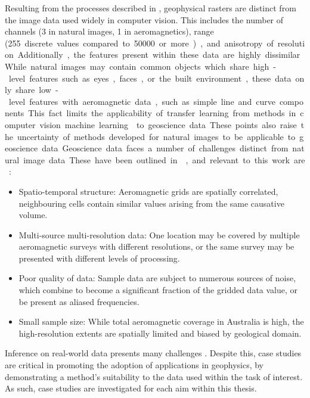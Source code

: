 Resulting from the processes described in , geophysical rasters are distinct from the image data used widely in computer vision.
This includes the number of channels (3 in natural images, 1 in aeromagnetics), range (\qty{255} discrete values compared to \qty{50000} or more), and anisotropy of resolution.
Additionally, the features present within these data are highly dissimilar.
While natural images may contain common objects which share high-level features such as eyes, faces, or the built environment, these data only share low-level features with aeromagnetic data, such as simple line and curve components.
This fact limits the applicability of transfer learning from methods in computer vision machine learning \parencite{tanSurveyDeepTransfer2018} to geoscience data.
These points also raise the uncertainty of methods developed for natural images to be  applicable to geoscience data.

Geoscience data faces a number of challenges distinct from natural image data. These have been outlined in \textcite{karpatneMachineLearningGeosciences2019}, and relevant to this work are:
\begin{itemize}
    \item{} Spatio-temporal structure: Aeromagnetic grids are spatially correlated, neighbouring cells contain similar values arising from the same causative volume.
    \item{} Multi-source multi-resolution data: One location may be covered by multiple aeromagnetic surveys with different resolutions, or the same survey may be presented with different levels of processing.
    \item{} Poor quality of data: Sample data are subject to numerous sources of noise, which combine to become a significant fraction of the gridded data value, or be present as aliased frequencies.
    \item{} Small sample size: While total aeromagnetic coverage in Australia is high, the high-resolution extents are spatially limited and biased by geological domain.
\end{itemize}

Inference on real-world data presents many challenges \parencite{nikolenkoSyntheticDataDeep2021,tremblayTrainingDeepNetworks2018}.
Despite this, case studies are critical in promoting the adoption of applications in geophysics, by demonstrating a method's suitability to the data used within the task of interest.
As such, case studies are investigated for each aim within this thesis.

